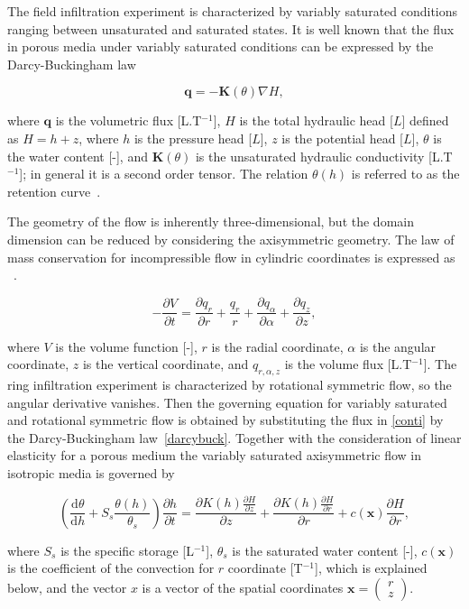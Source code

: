 \documentclass[review,times,3p,twocolumn,10pt]{elsarticle}
\newenvironment{lineq}
    {\begin{linenomath*}
    \begin{equation}
    }
    { 
    \end{equation} 
    \end{linenomath*}
    }
\newcommand{\dd}{\mathrm{d}}
\renewcommand{\vec}{\mathbf}
\begin{document}
The field infiltration experiment is characterized by variably saturated conditions ranging between unsaturated and saturated states. It is well known that the flux in porous media under variably saturated conditions can be expressed by the Darcy-Buckingham law~\citep{buckingham} \begin{lineq}\label{darcybuck}\vec{q} = -\mathbf{K}(\theta) \nabla H,\end{lineq} where $\vec{q}$ is the volumetric flux [L.T$^{-1}$], $H$ is the total hydraulic head [$L$] defined as $H=h+z$, where $h$ is the pressure head [$L$], $z$ is the potential head [$L$], $\theta$ is the water content [-], and $\mathbf{K}(\theta)$ is the unsaturated hydraulic conductivity  [L.T$^{-1}$]; in general it is a  second order tensor. The relation $\theta(h)$ is referred to as the retention curve~\citep{vangenuchten}.

The geometry of the flow is inherently three-dimensional, but the domain dimension can be reduced by considering the axisymmetric geometry. The law of mass conservation  for incompressible flow in cylindric coordinates is expressed as ~\citep{bear1979}.
\begin{lineq}
\label{conti}
-\frac{\partial V}{\partial t} = \frac{\partial q_r}{\partial r} + \frac{q_r}{r} + \frac{\partial q_{\alpha}}{\partial \alpha} + \frac{\partial q_z}{\partial z} ,
\end{lineq}
where $V$ is the volume function [-],  $r$ is the radial coordinate, $\alpha$ is the angular coordinate,  $z$ is the vertical coordinate, and $q_{r, \alpha, z}$ is the  volume flux [L.T$^{-1}$]. The ring infiltration experiment is characterized by rotational symmetric flow, so the angular derivative vanishes. Then the governing equation for  variably saturated and rotational symmetric flow is obtained by substituting the flux in \eqref{conti} by the Darcy-Buckingham law~\eqref{darcybuck}. Together with the consideration of linear elasticity for a porous medium the variably saturated axisymmetric flow in isotropic media is governed by
\begin{lineq}
\label{richaxi}
\left(\frac{\dd \theta}{\dd h} + S_s\frac{\theta(h)}{\theta_s} \right) \frac{\partial h}{\partial t}  =  \frac{\partial K(h) \frac{\partial H}{\partial z}}{\partial z} + \frac{\partial K(h) \frac{\partial H}{\partial r}}{\partial r} + c(\vec{x})\frac{\partial H}{\partial r},
\end{lineq}
where $S_s$ is the specific storage [L$^{-1}$], $\theta_s$ is the saturated water content [-],  $c(\vec{x})$ is the coefficient of the convection for $r$ coordinate [T$^{-1}$], which is explained below, and the vector $x$ is a vector of the spatial coordinates $\vec{x}=\left( \begin{smallmatrix} r \\ z \end{smallmatrix} \right)$.
\end{document}
